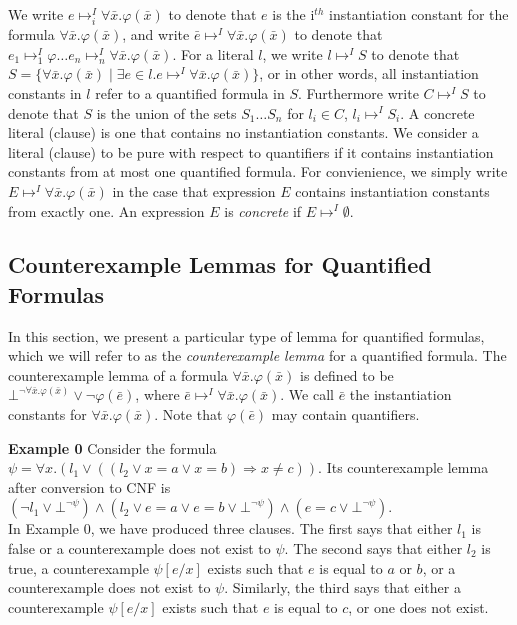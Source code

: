 \documentclass{llncs}
\begin{document}
We write $e \mapsto^I_i \forall \bar{x}. \varphi( \bar{x} )$ to denote that $e$ is the i$^{th}$ instantiation constant for the formula $\forall \bar{x}. \varphi( \bar{x} ) $, and write $\bar{e} \mapsto^I \forall \bar{x}. \varphi( \bar{x} )$ to denote that $e_1 \mapsto^I_1 \varphi \ldots e_n \mapsto^I_n \forall \bar{x}. \varphi( \bar{x} )$.
For a literal $l$, we write $l \mapsto^I S$ to denote that $S = \{ \forall \bar{x}. \varphi( \bar{x} ) \mid \exists e \in l. e \mapsto^I \forall \bar{x}. \varphi( \bar{x} ) \}$, or in other words, all instantiation constants in $l$ refer to a quantified formula in $S$.
Furthermore write $C \mapsto^I S$ to denote that $S$ is the union of the sets $S_1 \ldots S_n$ for $l_i \in C$, $l_i \mapsto^I S_i$.
A concrete literal (clause) is one that contains no instantiation constants.
We consider a literal (clause) to be pure with respect to quantifiers if it contains instantiation constants from at most one quantified formula.
For convienience, we simply write $E \mapsto^I \forall \bar{x}. \varphi( \bar{x} )$ in the case that expression $E$ contains instantiation constants from exactly one.
An expression $E$ is \emph{concrete} if $E \mapsto^I \emptyset$.

\subsection{Counterexample Lemmas for Quantified Formulas}
\label{sec:CENF}

In this section, we present a particular type of lemma for quantified formulas, which we will refer to as the \emph{counterexample lemma} for a quantified formula.
The counterexample lemma of a formula $\forall \bar{x}. \varphi( \bar{ x } )$ is defined to be $\bot^{\neg \forall \bar{x}. \varphi( \bar{x} )} \vee \neg \varphi( \bar{e} )$, where $\bar{e} \mapsto^I \forall \bar{x}. \varphi( \bar{x} )$.
We call $\bar{e}$ the instantiation constants for $\forall \bar{x}. \varphi( \bar{ x } )$.
Note that $\varphi(\bar{e})$ may contain quantifiers.

{\bf Example 0}
Consider the formula $\psi = \forall x. (l_1 \vee (( l_2 \vee x = a \vee x = b ) \Rightarrow x \neq c))$.
Its counterexample lemma after conversion to CNF is $( \neg l_1 \vee \bot^{\neg \psi}) \wedge ( l_2 \vee e = a \vee e = b \vee \bot^{\neg \psi} ) \wedge ( e = c \vee \bot^{\neg \psi})$. \\

In Example 0, we have produced three clauses.
The first says that either $l_1$ is false or a counterexample does not exist to $\psi$.
The second says that either $l_2$ is true, a counterexample $\psi[e/x]$ exists such that $e$ is equal to $a$ or $b$, or a counterexample does not exist to $\psi$. 
Similarly, the third says that either a counterexample $\psi[e/x]$ exists such that $e$ is equal to $c$, or one does not exist.
\end{document}
